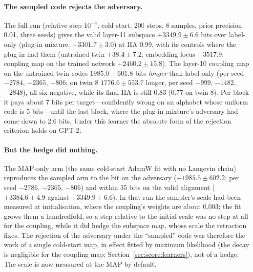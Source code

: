 \documentclass[11pt,a4paper]{article}
\begin{document}
\paragraph{The sampled code rejects the adversary.} The full run (relative step $10^{-4}$, cold start, 200 steps, 8 samples, prior precision 0.01, three seeds) gives the valid layer-11 subspace $+3349.9\pm6.6$ bits over label-only (plug-in mixture: $+3301.7\pm3.0$) at IIA 0.99, with its controls where the plug-in had them (untrained twin $+38.4\pm7.2$, embedding locus $-3517.9$, coupling map on the trained network $+2460.2\pm15.8$). The layer-10 coupling map on the untrained twin codes $1985.0\pm601.8$ bits \emph{longer} than label-only (per seed $-2784$, $-2365$, $-806$; on twin 8 $1776.6\pm553.7$ longer, per seed $-999$, $-1482$, $-2848$), all six negative, while its final IIA is still 0.83 (0.77 on twin 8). Per block it pays about 7 bits per target---confidently wrong on an alphabet whose uniform code is 5 bits---until the last block, where the plug-in mixture's adversary had come down to 2.6 bits. Under this learner the absolute form of the rejection criterion holds on GPT-2.

\paragraph{But the hedge did nothing.} The MAP-only arm (the same cold-start AdamW fit with no Langevin chain) reproduces the sampled arm to the bit on the adversary ($-1985.5\pm602.2$; per seed $-2786$, $-2365$, $-806$) and within 35 bits on the valid alignment ($+3384.6\pm4.9$ against $+3349.9\pm6.6$). In that run the sampler's scale had been measured at initialisation, where the coupling's weights are about $0.003$; the fit grows them a hundredfold, so a step relative to the initial scale was no step at all for the coupling, while it did hedge the subspace map, whose scale the retraction fixes. The rejection of the adversary under the ``sampled'' code was therefore the work of a single cold-start map, in effect fitted by maximum likelihood (the decay is negligible for the coupling map; Section~\ref{sec:score:learners}), not of a hedge. The scale is now measured at the MAP by default.
\end{document}
